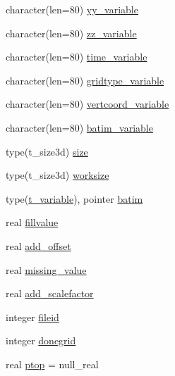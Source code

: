 \begin{DoxyCompactItemize}
character(len=80) \mbox{\hyperlink{structmodulewoaformat_1_1t__woaformat_a5dcebc3b7f53d0f39c3fbcba3eb76486}{yy\+\_\+variable}}
\item 
character(len=80) \mbox{\hyperlink{structmodulewoaformat_1_1t__woaformat_a627b1b6af50668b896791a4d9f6f460b}{zz\+\_\+variable}}
\item 
character(len=80) \mbox{\hyperlink{structmodulewoaformat_1_1t__woaformat_a22f50453651497429a33e34942b1ff85}{time\+\_\+variable}}
\item 
character(len=80) \mbox{\hyperlink{structmodulewoaformat_1_1t__woaformat_a8e5c83cc380e7b121e157efc1a2fa700}{gridtype\+\_\+variable}}
\item 
character(len=80) \mbox{\hyperlink{structmodulewoaformat_1_1t__woaformat_ae8f33507227fc7e79552ab1abf956a2b}{vertcoord\+\_\+variable}}
\item 
character(len=80) \mbox{\hyperlink{structmodulewoaformat_1_1t__woaformat_a33a69bfabd5b32113e449797f003eeba}{batim\+\_\+variable}}
\item 
type(t\+\_\+size3d) \mbox{\hyperlink{structmodulewoaformat_1_1t__woaformat_a9c44313510dfdaa242edabc47394134d}{size}}
\item 
type(t\+\_\+size3d) \mbox{\hyperlink{structmodulewoaformat_1_1t__woaformat_aa7bf6a9605acdee41b7033af08f16e55}{worksize}}
\item 
type(\mbox{\hyperlink{structmodulewoaformat_1_1t__variable}{t\+\_\+variable}}), pointer \mbox{\hyperlink{structmodulewoaformat_1_1t__woaformat_adf0f1eb523c1815c153f3b9511c4182b}{batim}}
\item 
real \mbox{\hyperlink{structmodulewoaformat_1_1t__woaformat_ad849cfc90744286693143984f9477a2f}{fillvalue}}
\item 
real \mbox{\hyperlink{structmodulewoaformat_1_1t__woaformat_aba7386316d233f45c3f9a203a5125d68}{add\+\_\+offset}}
\item 
real \mbox{\hyperlink{structmodulewoaformat_1_1t__woaformat_a0c3edec71a8917397d6b5ed7ff05fa40}{missing\+\_\+value}}
\item 
real \mbox{\hyperlink{structmodulewoaformat_1_1t__woaformat_a68ba7c236e756477f1f16c7952cfa402}{add\+\_\+scalefactor}}
\item 
integer \mbox{\hyperlink{structmodulewoaformat_1_1t__woaformat_a7193c8e9179094181eab9e4dfd38e4dd}{fileid}}
\item 
integer \mbox{\hyperlink{structmodulewoaformat_1_1t__woaformat_addcdc8c0f3843104a58b61773184d905}{donegrid}}
\item 
real \mbox{\hyperlink{structmodulewoaformat_1_1t__woaformat_a0eb1bd64f2f1628b9b9f878b6f9206f2}{ptop}} = null\+\_\+real

\end{DoxyCompactItemize}
